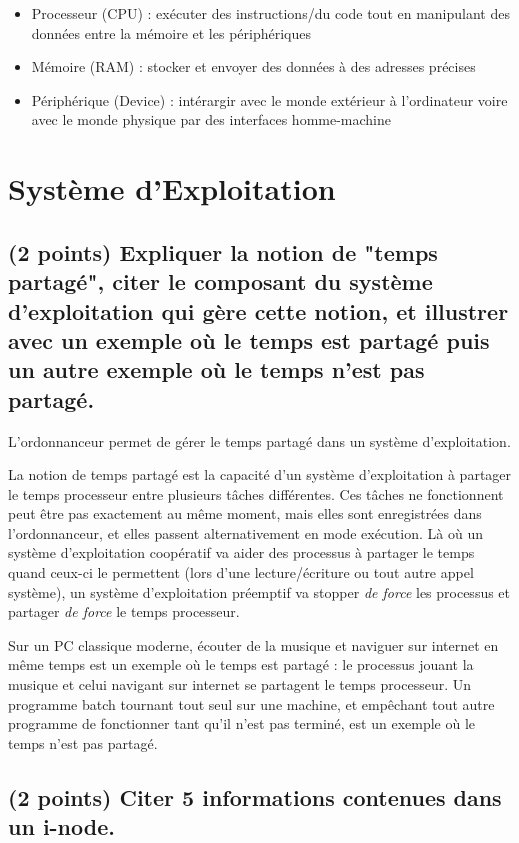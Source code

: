 \documentclass[11pt,a4paper]{article}
\begin{document}
\bigskip
\begin{itemize}
\item Processeur (CPU) : exécuter des instructions/du code tout en manipulant des données entre la mémoire et les périphériques
\item Mémoire (RAM) : stocker et envoyer des données à des adresses précises
\item Périphérique (Device) : intérargir avec le monde extérieur à l'ordinateur voire avec le monde physique par des interfaces homme-machine
\end{itemize}
\bigskip

\section{Système d'Exploitation} %

\subsection{(2 points) Expliquer la notion de "temps partagé", citer le composant du système d'exploitation qui gère cette notion, et illustrer avec un exemple où le temps est partagé puis un autre exemple où le temps n'est pas partagé.}

\bigskip
L'ordonnanceur permet de gérer le temps partagé dans un système d'exploitation.

La notion de temps partagé est la capacité d'un système d'exploitation à partager le temps processeur entre plusieurs tâches différentes.
Ces tâches ne fonctionnent peut être pas exactement au même moment, mais elles sont enregistrées dans l'ordonnanceur, et elles passent alternativement en mode exécution.
Là où un système d'exploitation coopératif va aider des processus à partager le temps quand ceux-ci le permettent (lors d'une lecture/écriture ou tout autre appel système), un système d'exploitation préemptif va stopper \textit{de force} les processus et partager \textit{de force} le temps processeur.

Sur un PC classique moderne, écouter de la musique et naviguer sur internet en même temps est un exemple où le temps est partagé : le processus jouant la musique et celui navigant sur internet se partagent le temps processeur.
Un programme batch tournant tout seul sur une machine, et empêchant tout autre programme de fonctionner tant qu'il n'est pas terminé, est un exemple où le temps n'est pas partagé.
\bigskip

\subsection{(2 points) Citer 5 informations contenues dans un i-node.}
\end{document}
